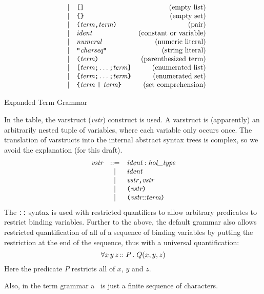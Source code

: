 {\begin{table}
\[\begin{array}{rclr}
    & | & \verb+[]+ & \mbox{(empty list)} \\
    & | & \verb+{}+ & \mbox{(empty set)} \\
    & | & \verb+(+ \term \verb+,+ \term \verb+)+ & \mbox{(pair)} \\
    & | & \ident & \mbox{(constant or variable)} \\
    & | & \numeral & \mbox{(numeric literal)} \\
    & | & \verb+"+\charseq \verb+"+& \mbox{(string literal)} \\
    & | & \verb+(+ \term \verb+)+ & \mbox{(parenthesized term)} \\
    & | & \verb+[+ \term \verb+;+ \ldots \verb+;+ \term \verb+]+ &
    \mbox{(enumerated list)} \\
    & | & \verb+{+ \term \verb+;+ \ldots \verb+;+ \term \verb+}+ &
    \mbox{(enumerated set)} \\
    & | & \verb+{+ \term \ \verb+|+\  \term \verb+}+ & \mbox{(set comprehension)}
  \end{array}
  \]
  \caption{Expanded Term Grammar} \label{expanded-grammar}
\end{table}

In the table, the varstruct ({\it vstr\/}) construct is used. A
varstruct is (apparently) an arbitrarily nested tuple of variables,
where each variable only occurs once. The translation of varstructs
into the internal abstract syntax trees is complex, so we avoid the
explanation (for this draft).
\[
\begin{array}{rcl}
  \vstr & ::= & \ident : \type \\
  & | & \ident  \\
  & | & \vstr \verb+,+ \vstr \\
  & | & \verb+(+ \vstr \verb+)+\\
  & | & \verb+(+\vstr {\tt ::} \term\verb+)+\\
\end{array}
\] The {\tt ::} syntax is used with restricted quantifiers to allow
arbitrary predicates to restrict binding variables.  Further to the
above, the default grammar also allows restricted quantification of
all of a sequence of binding variables by putting the restriction at
the end of the sequence, thus with a universal quantification: \[
\forall x \, y \, z \, {\tt ::} \; P \, . \; Q(x,y,z)
\] Here the predicate $P$ restricts all of $x$, $y$ and $z$.

Also, in the term grammar a \charseq\ is just a finite sequence of
characters.


}

